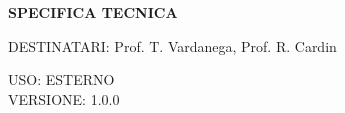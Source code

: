 \documentclass[5pt]{article}
\begin{document}
	\vspace{24pt}
	
	\begin{center}
		\textbf{\LARGE SPECIFICA TECNICA}
	\end{center}
	
	\vspace{13pt}
	
	\begin{flushleft}
		\begin{spacing}{1.5}
			DESTINATARI: Prof. T. Vardanega, Prof. R. Cardin\\%
		\end{spacing}
	\end{flushleft}
	
	\begin{flushright}
		\begin{spacing}{1}
			USO: ESTERNO\\
			VERSIONE: 1.0.0\\
		\end{spacing}
	\end{flushright}
	
	
	\restoregeometry
	
	\pagebreak
	
\end{document}
